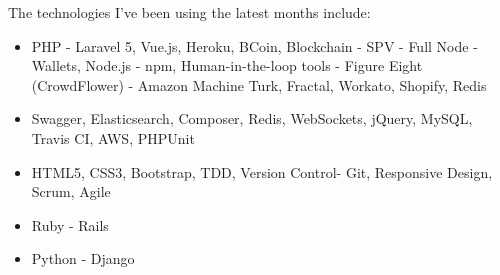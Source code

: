 \documentclass[11pt,a4paper,sans]{moderncv}        %
\begin{document}
\medskip The technologies I've been using the latest months include:
\begin{itemize}
  \item PHP - Laravel 5, Vue.js, Heroku, BCoin, Blockchain - SPV - Full Node - Wallets, Node.js - npm, Human-in-the-loop tools - Figure Eight (CrowdFlower) - Amazon Machine Turk, Fractal, Workato, Shopify, Redis
  \item Swagger, Elasticsearch, Composer, Redis, WebSockets, jQuery, MySQL, Travis CI, AWS, PHPUnit
  \item HTML5, CSS3, Bootstrap, TDD, Version Control- Git, Responsive Design, Scrum, Agile
  \item Ruby - Rails
  \item Python - Django
\end{itemize}
\clearpage
\end{document}
